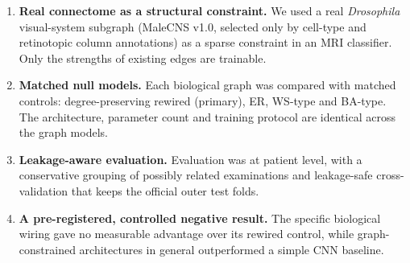 \begin{enumerate}
\item \textbf{Real connectome as a structural constraint.} We used a real \emph{Drosophila} visual-system subgraph (MaleCNS v1.0, selected only by cell-type and retinotopic column annotations) as a sparse constraint in an MRI classifier. Only the strengths of existing edges are trainable.
\item \textbf{Matched null models.} Each biological graph was compared with matched controls: degree-preserving rewired (primary), ER, WS-type and BA-type. The architecture, parameter count and training protocol are identical across the graph models.
\item \textbf{Leakage-aware evaluation.} Evaluation was at patient level, with a conservative grouping of possibly related examinations and leakage-safe cross-validation that keeps the official outer test folds.
\item \textbf{A pre-registered, controlled negative result.} The specific biological wiring gave no measurable advantage over its rewired control, while graph-constrained architectures in general outperformed a simple CNN baseline.
\end{enumerate}
